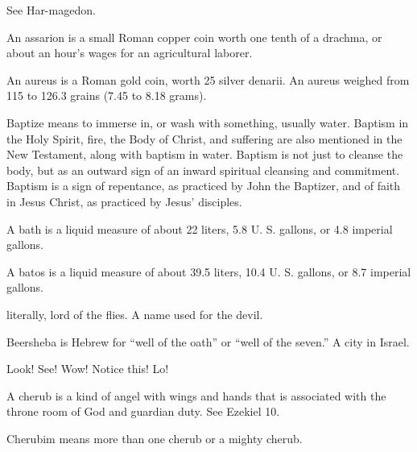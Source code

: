 {\par }{
\par }{\ILIB See Har-magedon.
\par }{
\par }{\ILIB An assarion is a small Roman copper coin worth one tenth of a drachma, or about an hour’s wages for an agricultural laborer.
\par }{
\par }{\ILIB An aureus is a Roman gold coin, worth 25 silver denarii. An aureus weighed from 115 to 126.3 grains (7.45 to 8.18 grams).
\par }{
\par }{\ILIB Baptize means to immerse in, or wash with something, usually water. Baptism in the Holy Spirit, fire, the Body of Christ, and suffering are also mentioned in the New Testament, along with baptism in water. Baptism is not just to cleanse the body, but as an outward sign of an inward spiritual cleansing and commitment. Baptism is a sign of repentance, as practiced by John the Baptizer, and of faith in Jesus Christ, as practiced by Jesus’ disciples.
\par }{
\par }{\ILIB A bath is a liquid measure of about 22 liters, 5.8 U. S. gallons, or 4.8 imperial gallons.
\par }{
\par }{\ILIB A batos is a liquid measure of about 39.5 liters, 10.4 U. S. gallons, or 8.7 imperial gallons.
\par }{
\par }{\ILIB literally, lord of the flies. A name used for the devil.
\par }{
\par }{\ILIB Beersheba is Hebrew for “well of the oath” or “well of the seven.” A city in Israel.
\par }{
\par }{\ILIB Look! See! Wow! Notice this! Lo!
\par }{
\par }{\ILIB A cherub is a kind of angel with wings and hands that is associated with the throne room of God and guardian duty. See Ezekiel 10.
\par }{
\par }{\ILIB Cherubim means more than one cherub or a mighty cherub.
\par }{
}
